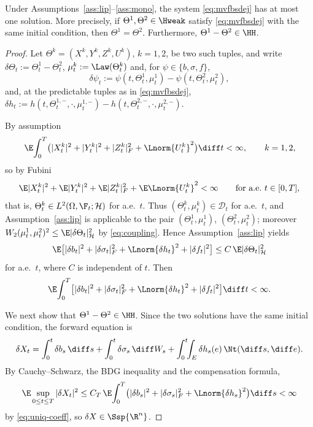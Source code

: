 \begin{theorem}[Uniqueness]\label{thm:uniq}
Under Assumptions~\ref{ass:lip}--\ref{ass:mono}, the system \eqref{eq:mvfbsdej} has at
most one solution. More precisely, if $\Theta^1,\Theta^2\in\Hweak$ satisfy
\eqref{eq:mvfbsdej} with the same initial condition, then $\Theta^1=\Theta^2$. Furthermore,
$\Theta^1-\Theta^2\in\HH$.
\end{theorem}
\begin{proof}
Let $\Theta^k=(X^k,Y^k,Z^k,U^k)$, $k=1,2$, be two such tuples, and write
$\delta\Theta_t:=\Theta^1_t-\Theta^2_t$, $\mu^k_t:=\Law(\Theta^k_t)$ and, for
$\psi\in\{b,\sigma,f\}$,
\[
\delta\psi_t:=\psi(t,\Theta^1_t,\mu^1_t)-\psi(t,\Theta^2_t,\mu^2_t),
\]
and, at the predictable tuples as in \eqref{eq:mvfbsdej},
$\delta h_t:=h(t,\Theta^{1,-}_t,\cdot,\mu^{1,-}_t)-h(t,\Theta^{2,-}_t,\cdot,\mu^{2,-}_t)$.

By assumption
\[
\E\!\int_0^T\!\big(|X^k_t|^2+|Y^k_t|^2+|Z^k_t|_F^2+\Lnorm{U^k_t}^2\big)\diff t<\infty,
\qquad k=1,2,
\]
so by Fubini
\[
\E|X^k_t|^2+\E|Y^k_t|^2+\E|Z^k_t|_F^2+\E\Lnorm{U^k_t}^2<\infty
\qquad\text{for a.e.\ }t\in[0,T],
\]
that is, $\Theta^k_t\in L^2(\Omega,\F_t;\mathcal H)$ for a.e.\ $t$. Thus
$(\Theta^k_t,\mu^k_t)\in\mathcal D_t$ for a.e.\ $t$, and Assumption~\ref{ass:lip} is
applicable to the pair $(\Theta^1_t,\mu^1_t)$, $(\Theta^2_t,\mu^2_t)$; moreover
$W_2(\mu^1_t,\mu^2_t)^2\le\E|\delta\Theta_t|_{\mathcal H}^2$ by \eqref{eq:coupling}.
Hence Assumption~\ref{ass:lip} yields
\[
\E\big[|\delta b_t|^2+|\delta\sigma_t|_F^2+\Lnorm{\delta h_t}^2+|\delta f_t|^2\big]
\le C\,\E|\delta\Theta_t|_{\mathcal H}^2
\]
for a.e.\ $t$, where $C$ is independent of $t$. Then
\begin{equation}\label{eq:uniq-coeff}
\E\!\int_0^T\!\big[|\delta b_t|^2+|\delta\sigma_t|_F^2+\Lnorm{\delta h_t}^2
+|\delta f_t|^2\big]\diff t<\infty .
\end{equation}

We next show that $\Theta^1-\Theta^2\in\HH$. Since the two solutions have the same
initial condition, the forward equation is
\[
\delta X_t=\int_0^t\delta b_s\,\diff s+\int_0^t\delta\sigma_s\,\diff W_s
+\int_0^t\!\!\int_E\delta h_s(e)\,\Nt(\diff s,\diff e).
\]
By Cauchy--Schwarz, the BDG inequality and the compensation formula,
\[
\E\sup_{0\le t\le T}|\delta X_t|^2
\le C_T\,\E\!\int_0^T\!\big(|\delta b_s|^2+|\delta\sigma_s|_F^2
+\Lnorm{\delta h_s}^2\big)\diff s<\infty
\]
by \eqref{eq:uniq-coeff}, so $\delta X\in\Ssp{\R^n}$.


\end{proof}
